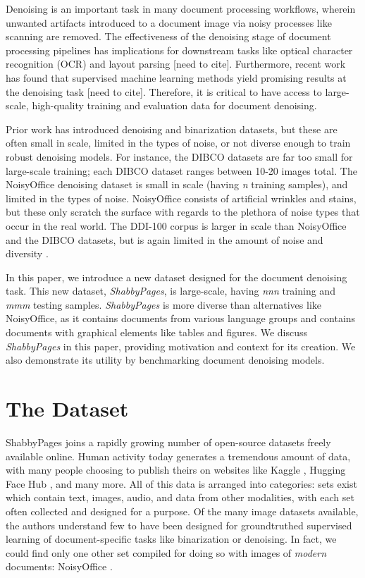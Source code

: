 \documentclass[runningheads]{llncs}
\begin{document}
Denoising is an important task in many document processing workflows, wherein unwanted artifacts introduced to a document image via noisy processes like scanning are removed.
The effectiveness of the denoising stage of document processing pipelines has implications for downstream tasks like optical character recognition (OCR) and layout parsing [need to cite].
Furthermore, recent work has found that supervised machine learning methods yield promising results at the denoising task [need to cite].
Therefore, it is critical to have access to large-scale, high-quality training and evaluation data for document denoising.

Prior work has introduced denoising and binarization datasets, but these are often small in scale, limited in the types of noise, or not diverse enough to train robust denoising models.
For instance, the DIBCO datasets are far too small for large-scale training; each DIBCO dataset ranges between 10-20 images total.
The NoisyOffice denoising dataset \cite{ref_NoisyOfficeDatabase} is small in scale (having \emph{n} training samples), and limited in the types of noise.
NoisyOffice consists of artificial wrinkles and stains, but these only scratch the surface with regards to the plethora of noise types that occur in the real world.
The DDI-100 corpus \cite{ddi-100-2019} is larger in scale than NoisyOffice and the DIBCO datasets, but is again limited in the amount of noise and diversity \cite{detection-masking-2022}.

In this paper, we introduce a new dataset designed for the document denoising task.
This new dataset, \emph{ShabbyPages}, is large-scale, having \emph{nnn} training and \emph{mmm} testing samples.
\emph{ShabbyPages} is more diverse than alternatives like NoisyOffice, as it contains documents from various language groups and contains documents with graphical elements like tables and figures.
We discuss \emph{ShabbyPages} in this paper, providing motivation and context for its creation.
We also demonstrate its utility by benchmarking document denoising models.

\section{The Dataset}
ShabbyPages joins a rapidly growing number of open-source datasets freely available online.
Human activity today generates a tremendous amount of data, with many people choosing to publish theirs on websites like Kaggle \cite{ref_Kaggle}, Hugging Face Hub \cite{ref_HuggingFaceHub}, and many more.
All of this data is arranged into categories: sets exist which contain text, images, audio, and data from other modalities, with each set often collected and designed for a purpose.
Of the many image datasets available, the authors understand few to have been designed for groundtruthed supervised learning of document-specific tasks like binarization or denoising.
In fact, we could find only one other set compiled for doing so with images of \textit{modern} documents: NoisyOffice \cite{ref_NoisyOffice}.
\end{document}
